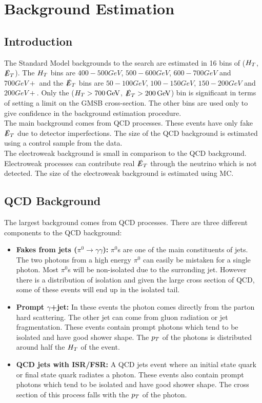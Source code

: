 \chapter{Background Estimation}

\section{Introduction}

The Standard Model backgrounds to the search are estimated in 16 bins of ($H_{T}$,
$\slashed{E}_{T}$). The $H_{T}$ bins are $400-500\unit{GeV}$, $500-600\unit{GeV}$,
$600-700\unit{GeV}$ and $700\unit{GeV}+$ and the $\slashed{E}_{T}$ bins are
$50-100\unit{GeV}$, $100-150\unit{GeV}$, $150-200\unit{GeV}$ and
$200\unit{GeV}+$. Only the ($H_{T}>700\, \mathrm{GeV}$, $\slashed{E}_{T}>200\, \mathrm{GeV}$) bin is
significant in terms of setting a limit on the GMSB cross-section. The other
bins are used only to give confidence in the background estimation procedure. \\

The main background comes from QCD processes. These events have only fake $\slashed{E}_{T}$
due to detector imperfections. The size of the QCD background is estimated using 
a control sample from the data. \\

The electroweak background is small in comparison to the QCD background.
Electroweak processes can contribute real $\slashed{E}_{T}$ through the neutrino which is
not detected. The size of the electroweak background is estimated using MC.

\section{QCD Background}
\label{sec:QCD_Background}

The largest background comes from QCD processes. There are three different 
components to the QCD background:

\begin{itemize}
\item {\bf Fakes from jets ($\pi^{0}\rightarrow\gamma\gamma$):} $\pi^{0}$s are
one of the main constituents of jets. The two photons from a high energy 
$\pi^{0}$ can easily be mistaken for a single photon. Most $\pi^{0}$s will be 
non-isolated due to the surronding jet. However there is a distribution of 
isolation and given the large cross section of QCD, some of these events will 
end up in the isolated tail.
\item {\bf Prompt $\gamma$+jet:} In these events the photon comes directly from
the parton hard scattering. The other jet can come from gluon radiation or
jet fragmentation. These events contain prompt photons which tend to be isolated
and have good shower shape. The $p_{T}$ of the photons is distributed around half
the $H_{T}$ of the event.
\item {\bf QCD jets with ISR/FSR:} A QCD jets event where an initial state quark
or final state quark radiates a photon. These events also contain prompt photons
which tend to be isolated and have good shower shape. The cross section of this 
process falls with the $p_{T}$ of the photon. 
\end{itemize}

